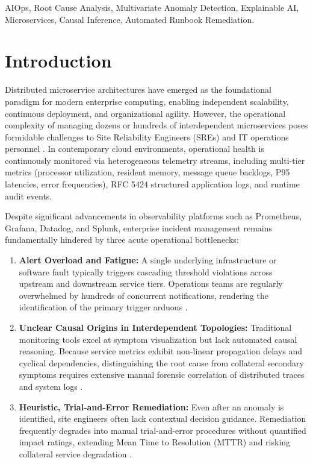\documentclass[conference]{IEEEtran}
\begin{document}
\begin{IEEEkeywords}
AIOps, Root Cause Analysis, Multivariate Anomaly Detection, Explainable AI, Microservices, Causal Inference, Automated Runbook Remediation.
\end{IEEEkeywords}

\section{Introduction}
Distributed microservice architectures have emerged as the foundational paradigm for modern enterprise computing, enabling independent scalability, continuous deployment, and organizational agility. However, the operational complexity of managing dozens or hundreds of interdependent microservices poses formidable challenges to Site Reliability Engineers (SREs) and IT operations personnel \cite{soldani2022anomaly, chen2020microrca}. In contemporary cloud environments, operational health is continuously monitored via heterogeneous telemetry streams, including multi-tier metrics (processor utilization, resident memory, message queue backlogs, P95 latencies, error frequencies), RFC 5424 structured application logs, and runtime audit events.

Despite significant advancements in observability platforms such as Prometheus, Grafana, Datadog, and Splunk, enterprise incident management remains fundamentally hindered by three acute operational bottlenecks:

\begin{enumerate}
    \item \textbf{Alert Overload and Fatigue:} A single underlying infrastructure or software fault typically triggers cascading threshold violations across upstream and downstream service tiers. Operations teams are regularly overwhelmed by hundreds of concurrent notifications, rendering the identification of the primary trigger arduous \cite{li2021actionable}.
    \item \textbf{Unclear Causal Origins in Interdependent Topologies:} Traditional monitoring tools excel at symptom visualization but lack automated causal reasoning. Because service metrics exhibit non-linear propagation delays and cyclical dependencies, distinguishing the root cause from collateral secondary symptoms requires extensive manual forensic correlation of distributed traces and system logs \cite{nedelkoski2020self, wang2018cloudranger}.
    \item \textbf{Heuristic, Trial-and-Error Remediation:} Even after an anomaly is identified, site engineers often lack contextual decision guidance. Remediation frequently degrades into manual trial-and-error procedures without quantified impact ratings, extending Mean Time to Resolution (MTTR) and risking collateral service degradation \cite{zhou2019fault}.
\end{enumerate}
\end{document}
